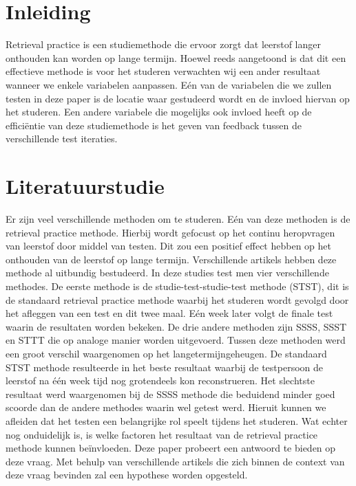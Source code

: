 \documentclass{hogent-article}
\affiliation{
	\textsuperscript{1} \href{mailto:Olivier.troch.w2257@student.hogent.be}{Olivier.troch.w2257@student.hogent.be}
}
\affiliation{
	\textsuperscript{2} \href{mailto:daan.vanvooren.y1502@student.hogent.be}{daan.vanvooren.y1502@student.hogent.be}
}
\affiliation{
	\textsuperscript{3}
	\href{mailto:robbie.verdurme.y9234@student.hogent.be}{robbie.verdurme.y9234@student.hogent.be}
}
\affiliation{
	\textsuperscript{4}
	\href{mailto;sebastien.wojtyla.y3274@student.hogent.be}{sebastien.wojtyla.y3274@student.hogent.be}
}
\begin{document}
	
	\flushbottom %
	\maketitle %
	\tableofcontents %
	\thispagestyle{empty} %
	
	
	\section{Inleiding}
	Retrieval practice is een studiemethode die ervoor zorgt dat leerstof langer onthouden kan worden op lange termijn. Hoewel reeds aangetoond is dat dit een effectieve methode is voor het studeren verwachten wij een ander resultaat wanneer we enkele variabelen aanpassen. Eén van de variabelen die we zullen testen in deze paper is de locatie waar gestudeerd wordt en de invloed hiervan op het studeren. 
	Een andere variabele die mogelijks ook invloed heeft op de efficiëntie van deze studiemethode is het geven van feedback tussen de verschillende test iteraties.
	
	\section{Literatuurstudie}
	Er zijn veel verschillende methoden om te studeren. Eén van deze methoden is de retrieval practice methode. Hierbij wordt gefocust op het continu heropvragen van leerstof door middel van testen. Dit zou een positief effect hebben op het onthouden van de leerstof op lange termijn.
    Verschillende artikels \autocite{butler2010repeated, pyc2012test, karpicke2007repeated, karpicke2008critical} hebben deze methode al uitbundig bestudeerd. In deze studies test men vier verschillende methodes. De eerste methode is de studie-test-studie-test methode (STST), dit is de standaard retrieval practice methode waarbij het studeren wordt gevolgd door het afleggen van een test en dit twee maal. Eén week later volgt de finale test waarin de resultaten worden bekeken. De drie andere methoden zijn SSSS, SSST en STTT die op analoge manier worden uitgevoerd.
	Tussen deze methoden werd een groot verschil waargenomen op het langetermijngeheugen. De standaard STST methode resulteerde in het beste resultaat waarbij de testpersoon de leerstof na één week tijd nog grotendeels kon reconstrueren. Het slechtste resultaat werd waargenomen bij de SSSS methode die beduidend minder goed scoorde dan de andere methodes waarin wel getest werd. Hieruit kunnen we afleiden dat het testen een belangrijke rol speelt tijdens het studeren. Wat echter nog onduidelijk is, is welke factoren het resultaat van de retrieval practice methode kunnen beïnvloeden. Deze paper probeert een antwoord te bieden op deze vraag. Met behulp van verschillende artikels die zich binnen de context van deze vraag bevinden zal een hypothese worden opgesteld.
    
\end{document}
